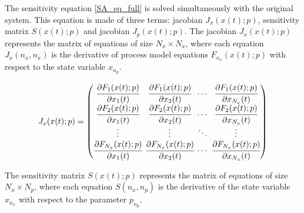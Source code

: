 \documentclass[../Article_Model_Parameters.tex]{subfiles}
\begin{document}
	The sensitivity equation \ref{SA_eq_full} is solved simultaneously with the original system. This equation is made of three terms: jacobian ${J_x}({x}(t);{p})$, sensitivity matrix ${S}({x}(t);{p})$ and jacobian ${J_p}({x}(t);{p})$. The jacobian ${J_x}({x}(t);{p})$ represents the matrix of equations of size $N_x \times N_x$, where each equation ${J_x}(n_x,n_x)$ is the derivative of process model equations ${F}_{n_x}({x}(t);{p})$ with respect to the state variable $x_{n_p}$.
	
	{\footnotesize
		\begin{align}
			\begingroup %
			\setlength\arraycolsep{2pt}
			{J_x}({x}(t);{p})=\begin{pmatrix}
				\cfrac{\partial {F_{1}}({x}(t);{p})}{\partial {x_{1}}(t)} & \cfrac{\partial {F_{1}}({x}(t);{p})}{\partial {x_{2}}(t)} & \cdots & \cfrac{\partial {F_{1}}({x}(t);{p})}{\partial {x_{N_x}}(t)}\\
				\cfrac{\partial {F_{2}}({x}(t);{p})}{\partial {x_{1}}(t)} & \cfrac{\partial {F_{2}}({x}(t);{p})}{\partial {x_{2}}(t)} & \cdots & \cfrac{\partial {F_{2}}({x}(t);{p})}{\partial {x_{N_x}}(t)}\\
				\vdots & \vdots & \ddots & \vdots\\ 
				\cfrac{\partial {F_{N_x}}({x}(t);{p})}{\partial {x_{1}}(t)} & \cfrac{\partial {F_{N_x}}({x}(t);{p})}{\partial {x_{2}}(t)} & \cdots & \cfrac{\partial {F_{N_x}}({x}(t);{p})}{\partial {x_{N_x}}(t)}\\
			\end{pmatrix}
			\endgroup
	\end{align} }
	
	The sensitivity matrix ${S}({x}(t);{p})$ represents the matrix of equations of size $N_x \times N_p$, where each equation ${S}(n_x,n_p)$ is the derivative of the state variable $x_{n_x}$ with respect to the parameter $p_{n_p}$.
	
\end{document}
